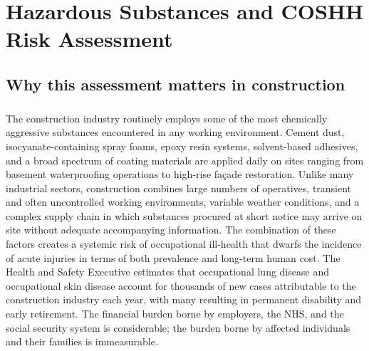 \chapter{Hazardous Substances and COSHH Risk Assessment}
\label{chap:Hazardous Substances and COSHH Risk Assessment}

\section{Why this assessment matters in construction}

\paragraph{}
The construction industry routinely employs some of the most chemically aggressive substances encountered in any working environment. Cement dust, isocyanate-containing spray foams, epoxy resin systems, solvent-based adhesives, and a broad spectrum of coating materials are applied daily on sites ranging from basement waterproofing operations to high-rise façade restoration. Unlike many industrial sectors, construction combines large numbers of operatives, transient and often uncontrolled working environments, variable weather conditions, and a complex supply chain in which substances procured at short notice may arrive on site without adequate accompanying information. The combination of these factors creates a systemic risk of occupational ill-health that dwarfs the incidence of acute injuries in terms of both prevalence and long-term human cost. The Health and Safety Executive estimates that occupational lung disease and occupational skin disease account for thousands of new cases attributable to the construction industry each year, with many resulting in permanent disability and early retirement. The financial burden borne by employers, the NHS, and the social security system is considerable; the burden borne by affected individuals and their families is immeasurable.

